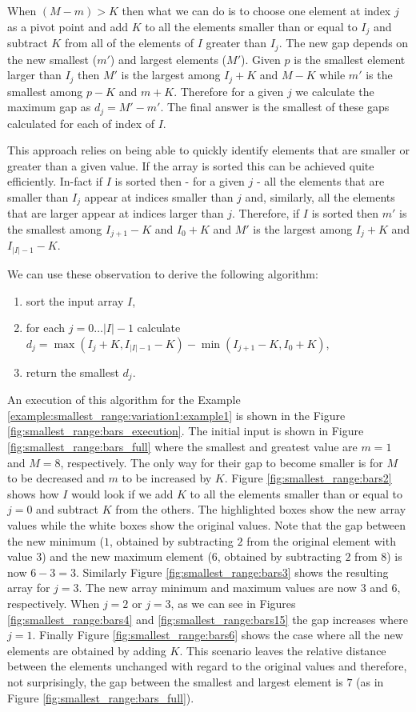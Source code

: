 When $(M-m) > K$ then what we can do is to choose one element at index $j$ as a pivot point
and add $K$ to all the elements smaller than or equal to $I_j$ and subtract $K$ from all of the elements
of $I$ greater than $I_j$. The new gap depends on the new smallest ($m'$) and largest elements
($M'$). Given $p$ is the smallest element larger than $I_j$ then $M'$ is the largest among $I_j+K$
and $M-K$ while $m'$ is the smallest among $p - K$ and $m+K$. Therefore for a given $j$ we calculate
the maximum gap as $d_j = M'-m'$. The final answer is the smallest of these gaps calculated for each
of index of $I$.

This approach relies on being able to quickly identify elements that are smaller or greater than a
given value. If the array is sorted this can be achieved quite efficiently. In-fact if $I$ is sorted
then  - for a given $j$  - all the elements that are smaller than $I_j$ appear at indices smaller than $j$
and, similarly, all the elements that are larger appear at indices larger than $j$. Therefore, if
$I$ is sorted then $m'$ is the smallest among $I_{j+1}-K$ and $I_0 +K$ and $M'$ is the largest among
$I_j+K$ and $I_{|I|-1}-K$.


We can use these observation to derive the following algorithm:
\begin{enumerate}
	\item sort the input array $I$,
	\item for each $j = 0 \ldots |I|-1$ calculate $d_j = \max{(I_j+K,I_{|I|-1}-K)} -
	\min{(I_{j+1}-K, I_0 +K)}$,
	\item return the smallest $d_j$.
\end{enumerate}
An execution of this algorithm for the Example \ref{example:smallest_range:variation1:example1} is
shown in the Figure \ref{fig:smallest_range:bars_execution}. The initial input is shown in Figure
\ref{fig:smallest_range:bars_full} where the smallest and greatest value are $m=1$ and $M=8$,
respectively. The only way for their gap to become smaller is for $M$ to be decreased and $m$ to be
increased by $K$. Figure \ref{fig:smallest_range:bars2} shows how $I$ would look if we 
add $K$ to all the elements smaller than or equal to $j=0$ and subtract $K$ from the others. The
highlighted boxes show the new array values while the white boxes show the original values. Note
that the gap between the new minimum ($1$, obtained by subtracting $2$ from the original element
with value $3$) and the new maximum element ($6$, obtained by subtracting $2$ from $8$) is now
$6-3=3$. Similarly Figure \ref{fig:smallest_range:bars3} shows the resulting array for $j=3$. The
new array minimum and maximum values are now $3$ and $6$, respectively. When $j=2$ or $j=3$, as we
can see in Figures \ref{fig:smallest_range:bars4} and \ref{fig:smallest_range:bars15} the gap
increases where $j=1$. Finally Figure \ref{fig:smallest_range:bars6} shows the
case where all the new elements are obtained by adding $K$. This scenario leaves the relative
distance between the elements unchanged with regard to the original values and therefore, not surprisingly,
the gap between the smallest and largest element is $7$ (as in Figure
\ref{fig:smallest_range:bars_full}).


